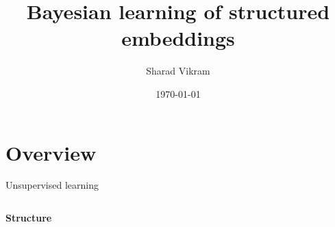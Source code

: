 \documentclass[10pt, compress]{beamer}
\title{Bayesian learning of structured embeddings}
\subtitle{}
\date{\today}
\author{Sharad Vikram}
\institute{UCSD}
\begin{document}
\begin{frame}
  \titlepage
\end{frame}

\section{Overview}

\begin{frame}{Unsupervised learning}
  \begin{columns}[T]
    \begin{column}{0.5\textwidth}
      \begin{overlayarea}{\textwidth}{7cm}
        \begin{center}
          \Large \textbf{Structure}\\ \vspace{10pt}

\end{center}
\end{overlayarea}
\end{column}
\end{columns}
\end{frame}
\end{document}

